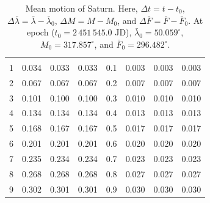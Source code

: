 \begin{table}[!h]
\begin{tabular}{rrrr|rrrr}
&&&&&&&\\
1 &   0.034 &   0.033 &   0.033 & 0.1 &   0.003 &   0.003 &   0.003\\
2 &   0.067 &   0.067 &   0.067 & 0.2 &   0.007 &   0.007 &   0.007\\
3 &   0.101 &   0.100 &   0.100 & 0.3 &   0.010 &   0.010 &   0.010\\
4 &   0.134 &   0.134 &   0.134 & 0.4 &   0.013 &   0.013 &   0.013\\
5 &   0.168 &   0.167 &   0.167 & 0.5 &   0.017 &   0.017 &   0.017\\
6 &   0.201 &   0.201 &   0.201 & 0.6 &   0.020 &   0.020 &   0.020\\
7 &   0.235 &   0.234 &   0.234 & 0.7 &   0.023 &   0.023 &   0.023\\
8 &   0.268 &   0.268 &   0.268 & 0.8 &   0.027 &   0.027 &   0.027\\
9 &   0.302 &   0.301 &   0.301 & 0.9 &   0.030 &   0.030 &   0.030\\
\end{tabular}
\caption{Mean motion of Saturn.  Here, $\Delta t = t-t_0$, $\Delta\bar{\lambda} = \bar{\lambda}-\bar{\lambda}_0$,  $\Delta M = M - M_0$, and $\Delta\bar{F} = \bar{F} - \bar{F}_0$.  At epoch  ($t_0 = 2\,451\,545.0$ JD), $\bar{\lambda}_0 = 50.059^\circ$,  $M_0 = 317.857^\circ$, and
$\bar{F}_0 =296.482^\circ$. }\label{vt14}
\end{table}

